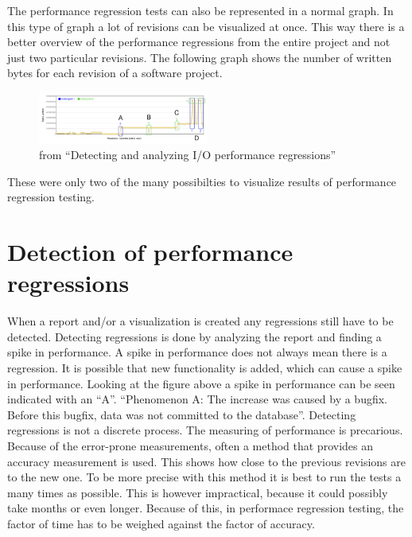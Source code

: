 The performance regression tests can also be represented in a normal graph. In this type of graph a lot of revisions can be visualized at once. This way there is a better overview of the performance regressions from the entire project and not just two particular revisions. The following graph shows the number of written bytes for each revision of a software project.

\begin{figure}[h]
\begin{center}
  \includegraphics[width=0.5\textwidth]{Figures/bytegraph.png}
\end{center}
  \caption{from ``Detecting and analyzing I/O performance regressions''\cite{bezemer2014detecting}}

\end{figure}

These were only two of the many possibilties to visualize results of performance regression testing.

\section{Detection of performance regressions}
When a report and/or a visualization is created any regressions still have to be detected. Detecting regressions is done by analyzing the report and finding a spike in performance. A spike in performance does not always mean there is a regression. It is possible that new functionality is added, which can cause a spike in performance. Looking at the figure above a spike in performance can be seen indicated with an ``A''. ``Phenomenon A: The increase was caused by a bugfix. Before this bugfix, data was not committed to the database''\cite{bezemer2014detecting}.\newline
Detecting regressions is not a discrete process. The measuring of performance is precarious. Because of the error-prone measurements, often a method that provides an accuracy measurement is used. This shows how close to the previous revisions are to the new one. To be more precise with this method it is best to run the tests a many times as possible. This is however impractical, because it could possibly take months or even longer. Because of this, in performace regression testing, the factor of time has to be weighed against the factor of accuracy.


